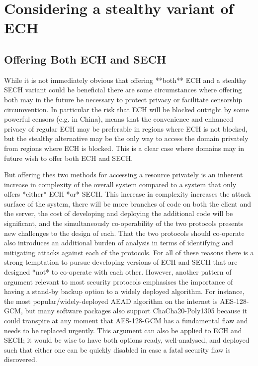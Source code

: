 \section{Considering a stealthy variant of ECH}
\subsection{Offering Both ECH and SECH}
While it is not immediately obvious that offering **both** ECH and a stealthy SECH variant could be beneficial there are some circumstances where offering both may in the future be necessary to protect privacy or facilitate censorship circumvention. In particular the risk that ECH will be blocked outright by some powerful censors (e.g. in China), means that the convenience and enhanced privacy of regular ECH may be preferable in regions where ECH is not blocked, but the stealthy alternative may be the only way to access the domain privately from regions where ECH is blocked. This is a clear case where domains may in future wish to offer both ECH and SECH.

But offering thes two methods for accessing a resource privately is an inherent increase in complexity of the overall system compared to a system that only offers *either* ECH *or* SECH. This increase in complexity increases the attack surface of the system, there will be more branches of code on both the client and the server, the cost of developing and deploying the additional code will be significant, and the simultaneously co-operability of the two protocols presents new challenges to the design of each. That the two protocols should co-operate also introduces an additional burden of analysis in terms of identifying and mitigating attacks against each of the protocols. For all of these reasons there is a strong temptation to pursue developing versions of ECH and SECH that are designed *not* to co-operate with each other. However, another pattern of argument relevant to most security protocols emphasises the importance of having a stand-by backup option to a widely deployed algorithm. For instance, the most popular/widely-deployed AEAD algorithm on the internet is AES-128-GCM, but many software packages also support ChaCha20-Poly1305 because it could transpire at any moment that AES-128-GCM has a fundamental flaw and needs to be replaced urgently. This argument can also be applied to ECH and SECH; it would be wise to have both options ready, well-analysed, and deployed such that either one can be quickly disabled in case a fatal security flaw is discovered.

